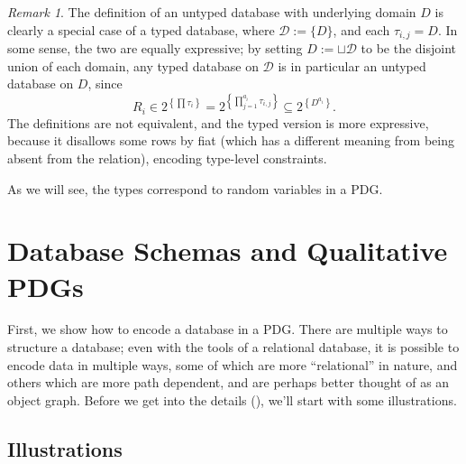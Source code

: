 \documentclass{article}
\theoremstyle{definition}
\theoremstyle{remark}
\newtheorem*{remark}{Remark}
\begin{document}
\begin{remark}
    The definition of an untyped database with underlying domain $D$ is clearly a special case of a typed database, where $\mathcal D := \{ D \}$, and each $\tau_{i,j} = D$. 
    In some sense, the two are equally expressive; by setting $D := \sqcup \mathcal D$ to be the disjoint union of each domain, any typed database on $\mathcal D$ is in particular an untyped database on $D$, since
    \[R_i \in 2^{\left\{\prod \tau_i\right\}} = 2^{\left\{\prod_{j =1}^{a_i} \tau_{i,j}\right\}} 
        \subseteq 2^{\left\{D^{a_i}\right\}} .\] 
  	The definitions are not equivalent, and the typed version is more expressive, because it disallows some rows by fiat (which has a different meaning from being absent from the relation), encoding type-level constraints. 
\end{remark}

As we will see, the types correspond to random variables in a PDG.

\section{Database Schemas and Qualitative PDGs}

First, we show how to encode a database in a PDG. There are multiple ways to structure a database; even with the tools of a relational database, it is possible to encode data in multiple ways, some of which are more ``relational'' in nature, and others which are more path dependent, and are perhaps better thought of as an object graph. 
Before we get into the details (), we'll start with some illustrations. 


\subsection{Illustrations}
\end{document}
